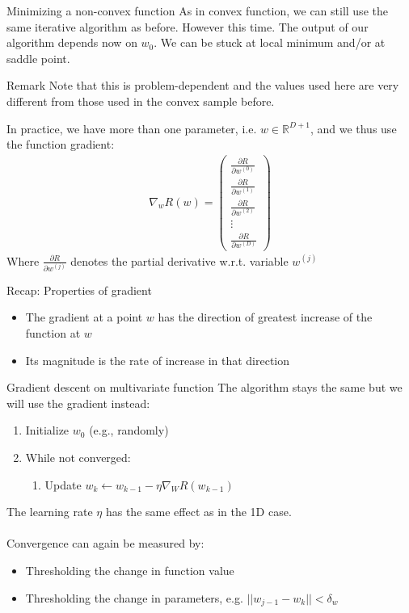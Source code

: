 \begin{parag}{Minimizing a non-convex function}
    As in convex function, we can still use the same iterative algorithm as before. However this time. The output of our algorithm depends now on $w_0$. We can be stuck at local minimum and/or at saddle point.
	\begin{subparag}{Remark}
	    Note that this is problem-dependent and the values used here are very different from those used in the convex sample before.
	\end{subparag}
	In practice, we have more than one parameter, i.e. $w \in \mathbb{R}^{D + 1}$, and we thus use the function gradient:
	\begin{align*} 
		\nabla_w R\left(w\right) = \begin{pmatrix} \frac{\partial R}{\partial w^{\left(0\right)}}  \\ \frac{\partial R}{\partial w^{\left(1\right)}}  \\ \frac{\partial R}{\partial w^{\left(2\right)}}  \\ \vdots \\ \frac{\partial R}{\partial w^{\left(D\right)}}  \end{pmatrix} 
	\end{align*}
	Where $\frac{\partial R}{\partial w^{\left(j\right)}} $ denotes the partial derivative w.r.t. variable $w^{\left(j\right)}$
\end{parag}
\begin{parag}{Recap: Properties of gradient}
	\begin{itemize}
		\item The gradient at a point $w$ has the direction of greatest increase of the function at $w$
    \item Its magnitude is the rate of increase in that direction
\end{itemize}
\end{parag}
\begin{parag}{Gradient descent on multivariate function}
    The algorithm stays the same but we will use the gradient instead:
	\begin{enumerate}
	    \item Initialize $w_0$ (e.g., randomly)
	    \item While not converged:
			\begin{enumerate}
			\item Update $w_k \leftarrow w_{k-1} - \eta \nabla_W R\left(w_{k-1}\right)$
			\end{enumerate}
	\end{enumerate}
	The learning rate $\eta$ has the same effect as in the 1D case.\\
	$ $\\
	Convergence can again be measured by:
	\begin{itemize}
	    \item Thresholding the change in function value
	    \item Thresholding the change in parameters, e.g. $||w_{j-1} - w_k|| < \delta_w$
	\end{itemize}
\end{parag}
